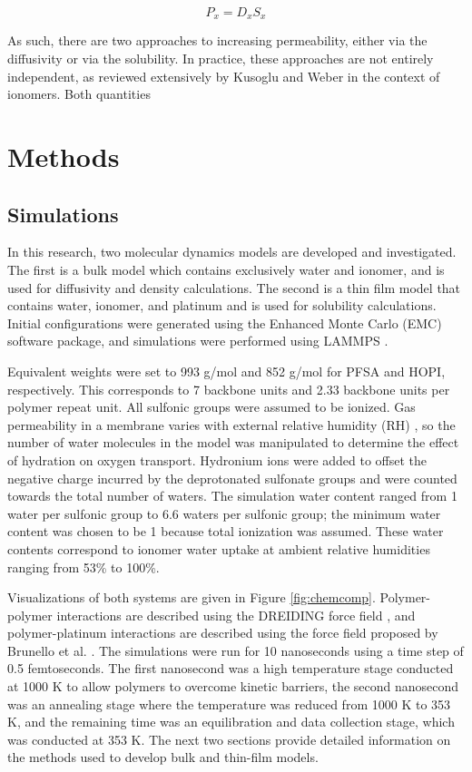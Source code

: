 \documentclass[journal=jacsat,manuscript=article]{achemso}
\begin{document}
\begin{equation}
    \label{eqn:permeability}
    P_x = D_xS_x
\end{equation}

As such, there are two approaches to increasing permeability, either via the diffusivity or via the solubility. In practice, these approaches are not entirely independent, as reviewed extensively by Kusoglu and Weber\cite{Kusoglu2017} in the context of ionomers. Both quantities 

\section{Methods}

\subsection{Simulations}
In this research, two molecular dynamics models are developed and investigated. The first is a bulk model which contains exclusively water and ionomer, and is used for diffusivity and density calculations. The second is a thin film model that contains water, ionomer, and platinum and is used for solubility calculations. Initial configurations were generated using the Enhanced Monte Carlo (EMC) software package\cite{in_t_veld_temperature-dependent_2003}, and simulations were performed using LAMMPS \cite{thompson_lammps_2022}.

Equivalent weights were set to 993 g/mol and 852 g/mol for PFSA and HOPI, respectively. This corresponds to 7 backbone units and 2.33 backbone units per polymer repeat unit. All sulfonic groups were assumed to be ionized. Gas permeability in a membrane varies with external relative humidity (RH) \cite{broka_oxygen_1997,novitski_determination_2015,schalenbach_gas_2015}, so the number of water molecules in the model was manipulated to determine the effect of hydration on oxygen transport. Hydronium ions were added to offset the negative charge incurred by the deprotonated sulfonate groups and were counted towards the total number of waters.  The simulation water content ranged from 1 water per sulfonic group to 6.6 waters per sulfonic group; the minimum water content was chosen to be 1 because total ionization was assumed. These water contents correspond to ionomer water uptake at ambient relative humidities ranging from 53\% to 100\%. 

Visualizations of both systems are given in Figure \ref{fig:chemcomp}. Polymer-polymer interactions are described using the DREIDING force field \cite{mayo_dreiding_1990}, and polymer-platinum interactions are described using the force field proposed by Brunello et al. \cite{brunello_interactions_2016}. The simulations were run for 10 nanoseconds using a time step of 0.5 femtoseconds. The first nanosecond was a high temperature stage conducted at 1000 K to allow polymers to overcome kinetic barriers, the second nanosecond was an annealing stage where the temperature was reduced from 1000 K to 353 K, and the remaining time was an equilibration and data collection stage, which was conducted at 353 K. The next two sections provide detailed information on the methods used to develop bulk and thin-film models. 
\end{document}

